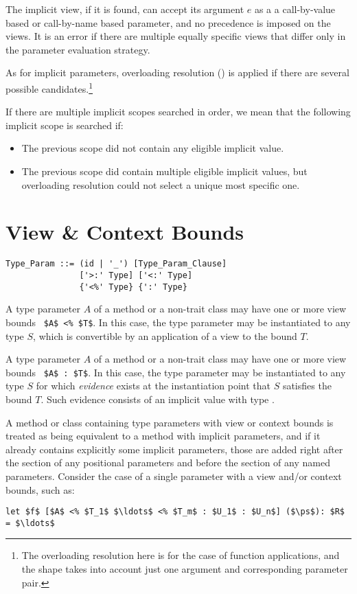 The implicit view, if it is found, can accept its argument $e$ as a a call-by-value based or call-by-name based parameter, and no precedence is imposed on the views. It is an error if there are multiple equally specific views that differ only in the parameter evaluation strategy. 

As for implicit parameters, overloading resolution () is applied if there are several possible candidates.\footnote{The overloading resolution here is for the case of function applications, and the shape takes into account just one argument and corresponding parameter pair.}

If there are multiple implicit scopes searched in order, we mean that the following implicit scope is searched if:
\begin{itemize}
  \item The previous scope did not contain any eligible implicit value.
  \item The previous scope did contain multiple eligible implicit values, but overloading resolution could not select a unique most specific one. 
\end{itemize}





\section{View \& Context Bounds}
\label{sec:view-bounds}
\label{sec:context-bounds}

\grammar\begin{lstlisting}
Type_Param ::= (id | '_') [Type_Param_Clause]
               ['>:' Type] ['<:' Type]
               {'<%' Type} {':' Type}
\end{lstlisting}

A type parameter $A$ of a method or a non-trait class may have one or more view bounds ~\lstinline!$A$ <% $T$!. In this case, the type parameter may be instantiated to any type $S$, which is convertible by an application of a view to the bound $T$.

A type parameter $A$ of a method or a non-trait class may have one or more view bounds ~\lstinline!$A$ : $T$!. In this case, the type parameter may be instantiated to any type $S$ for which {\em evidence} exists at the instantiation point that $S$ satisfies the bound $T$. Such evidence consists of an implicit value with type . 

A method or class containing type parameters with view or context bounds is treated as being equivalent to a method with implicit parameters, and if it already contains explicitly some implicit parameters, those are added right after the section of any positional parameters and before the section of any named parameters. Consider the case of a single parameter with a view and/or context bounds, such as: 
\begin{lstlisting}
let $f$ [$A$ <% $T_1$ $\ldots$ <% $T_m$ : $U_1$ : $U_n$] ($\ps$): $R$ = $\ldots$
\end{lstlisting}

